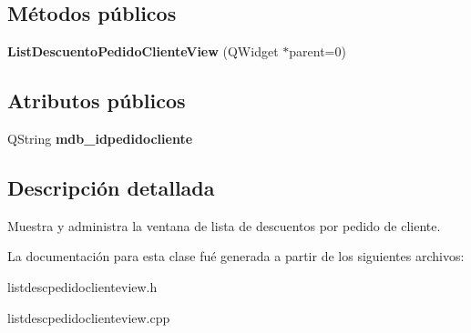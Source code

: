 \subsection*{M\'{e}todos p\'{u}blicos}
\begin{CompactItemize}
\item 
{\bf List\-Descuento\-Pedido\-Cliente\-View} (QWidget $\ast$parent=0)\label{classListDescuentoPedidoClienteView_a0}

\end{CompactItemize}
\subsection*{Atributos p\'{u}blicos}
\begin{CompactItemize}
\item 
QString {\bf mdb\_\-idpedidocliente}\label{classListDescuentoPedidoClienteView_o0}

\end{CompactItemize}


\subsection{Descripci\'{o}n detallada}
Muestra y administra la ventana de lista de descuentos por pedido de cliente. 



La documentaci\'{o}n para esta clase fu\'{e} generada a partir de los siguientes archivos:\begin{CompactItemize}
\item 
listdescpedidoclienteview.h\item 
listdescpedidoclienteview.cpp\end{CompactItemize}
